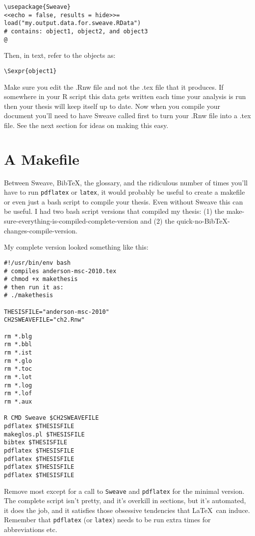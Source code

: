 \documentclass[12pt]{article}
\begin{document}
\begin{verbatim}
\usepackage{Sweave} 
<<echo = false, results = hide>>=
load("my.output.data.for.sweave.RData") 
# contains: object1, object2, and object3
@
\end{verbatim}

Then, in text, refer to the objects as:
\begin{verbatim}
\Sexpr{object1} 
\end{verbatim}

Make sure you edit the .Rnw file and not the .tex file that it produces.
If somewhere in your R script this data gets written each time your analysis is run then your thesis will keep itself up to date. Now when you compile your document you'll need to have Sweave called first to turn your .Rnw file into a .tex file. See the next section for ideas on making this easy.

\section{A Makefile}
Between Sweave, Bib\TeX, the glossary, and the ridiculous number of times you'll have to run \verb#pdflatex# or \verb#latex#, it would probably be useful to create a makefile or even just a bash script to compile your thesis. Even without Sweave this can be useful. I had two bash script versions that compiled my thesis: (1) the make-sure-everything-is-compiled-complete-version and (2) the quick-no-Bib\TeX-changes-compile-version.

My complete version looked something like this:
\begin{verbatim}
#!/usr/bin/env bash
# compiles anderson-msc-2010.tex
# chmod +x makethesis
# then run it as:
# ./makethesis

THESISFILE="anderson-msc-2010"
CH2SWEAVEFILE="ch2.Rnw"

rm *.blg
rm *.bbl
rm *.ist
rm *.glo
rm *.toc
rm *.lot
rm *.log
rm *.lof
rm *.aux

R CMD Sweave $CH2SWEAVEFILE
pdflatex $THESISFILE
makeglos.pl $THESISFILE
bibtex $THESISFILE
pdflatex $THESISFILE
pdflatex $THESISFILE
pdflatex $THESISFILE
pdflatex $THESISFILE
\end{verbatim}

Remove most except for a call to \verb#Sweave# and \verb#pdflatex# for the minimal version. The complete script isn't pretty, and it's overkill in sections, but it's automated, it does the job, and it satisfies those obsessive tendencies that \LaTeX\ can induce.
Remember that \verb#pdflatex# (or \verb#latex#) needs to be run extra times for abbreviations etc.
\end{document}

